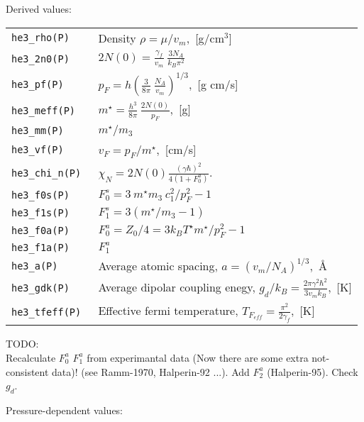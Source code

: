 \documentclass[a4paper]{article}
\begin{document}
Derived values:

\medskip
\noindent\begin{tabular}{lp{11cm}}
\tt he3\_rho(P)    & Density $\rho = \mu/v_m$,~[g/cm$^3$]\\
\tt he3\_2n0(P)    & $\displaystyle 2N(0) = \frac{\gamma_f}{v_m}
                     \ \frac{3 N_A}{k_B \pi^2}$\\
\tt he3\_pf(P)     & $\displaystyle p_F = h \left(\frac{3}{8\pi}
                     \ \frac{N_A}{v_m}\right)^{1/3}$,~[g cm/s]\\
\tt he3\_meff(P)   & $\displaystyle m^\star = \frac{h^3}{8\pi}
                     \ \frac{2N(0)}{p_F}$,~[g]\\
\tt he3\_mm(P)     &$m^\star/m_3$\\
\tt he3\_vf(P)     &$\displaystyle v_F = p_F/m^\star$,~[cm/s]\\
\tt he3\_chi\_n(P) &$\displaystyle \chi_{N} = 2N(0) \frac{(\gamma\hbar)^2}{4(1 + F_0^a)}$.\\
\tt he3\_f0s(P)    &$\displaystyle F_0^s = 3\ m^\star m_3\ c_1^2 / p_F^2 - 1$\\
\tt he3\_f1s(P)    &$\displaystyle F_1^s = 3(m^\star/m_3 - 1)$\\
\tt he3\_f0a(P)    &$\displaystyle F_0^a = Z_0/4 = 3 k_B T^\star m^\star / p_F^2 - 1$\\
\tt he3\_f1a(P)    &$\displaystyle F_1^a$\\

\tt he3\_a(P)      &Average atomic spacing,
                    $\displaystyle a=(v_m/N_A)^{1/3}$,~\AA\\
\tt he3\_gdk(P)    &Average dipolar coupling enegy,
                    $\displaystyle g_d/k_B = \frac{2\pi\gamma^2\hbar^2}{3 v_m k_B}$,~[K]\\
\tt he3\_tfeff(P)  &Effective fermi temperature,
                    $\displaystyle T_{F_{eff}} = \frac{\pi^2}{2\gamma_f}$,~[K]\\
\end{tabular}
\medskip

\noindent TODO:\\
Recalculate $F_0^a$ $F_1^a$ from experimantal data (Now there are some extra
not-consistent data)!
(see Ramm-1970, Halperin-92 ...). Add $F_2^a$ (Halperin-95).
Check $g_d$.

\eject
Pressure-dependent values:
\medskip

{\small}
\end{document}
